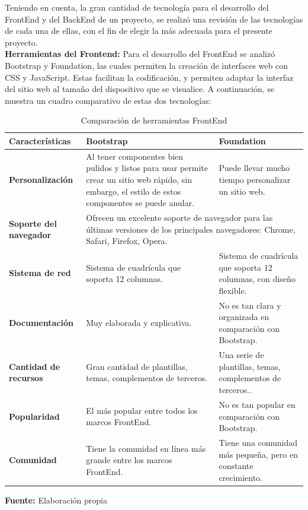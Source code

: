 Teniendo en cuenta, la gran cantidad de tecnología para el desarrollo del FrontEnd y del BackEnd de un proyecto, se realizó una revisión de las tecnologías de cada una de ellas, con el fin de elegir la más adecuada para el presente proyecto. \ \\

\textbf{Herramientas del Frontend: }Para el desarrollo del FrontEnd se analizó Bootstrap y Foundation, las cuales permiten la creación de interfaces web con CSS y JavaScript. Estas  facilitan la codificación, y permiten adaptar la interfaz del sitio web al tamaño del dispositivo que se visualice. A continuación, se muestra un cuadro comparativo de estas dos tecnologías:

\begin{table}[H]
    \centering
    \begin{tabular}{|p{3cm}|p{6cm}|p{6cm}|}
        \hline
        \textbf{Características}&\textbf{Bootstrap}&\textbf{Foundation}\\
        \hline
        \textbf{Personalización}&Al tener componentes bien pulidos y listos para usar permite crear un sitio web rápido, sin embargo, el estilo de estos componentes se puede anular.& Puede llevar mucho tiempo personalizar un sitio web. \\
        \hline
         \multicolumn{1}{|p{3cm}|}{ \textbf{Soporte del navegador}}&\multicolumn{2}{|p{12cm}|}{Ofrecen un excelente soporte de navegador para las últimas versiones de los principales navegadores: Chrome, Safari, Firefox, Opera.}\\
        \hline
        \textbf{Sistema de red}&Sistema de cuadrícula que soporta 12 columnas.&Sistema de cuadrícula que soporta 12 columnas, con diseño flexible. \\
        \hline
        \textbf{Documentación}&Muy elaborada y explicativa.&No es tan clara y organizada en comparación con Bootstrap. \\
        \hline
        \textbf{Cantidad de recursos}&Gran cantidad de plantillas, temas, complementos de terceros.&Una serie de plantillas, temas, complementos de terceros.. \\
        \hline
        \textbf{Popularidad}&El más popular entre todos los marcos FrontEnd.&No es tan popular en comparación con Bootstrap.\\
        \hline
        \textbf{Comunidad}&Tiene la comunidad en línea más grande entre los marcos FrontEnd.&Tiene una comunidad más pequeña, pero en constante crecimiento.\\
        \hline
    \end{tabular}
    \caption{Comparación de herramientas FrontEnd}
    \centering \scriptsize \textbf{Fuente:} Elaboración propia
    \label{tab:frontEnd}
\end{table}


